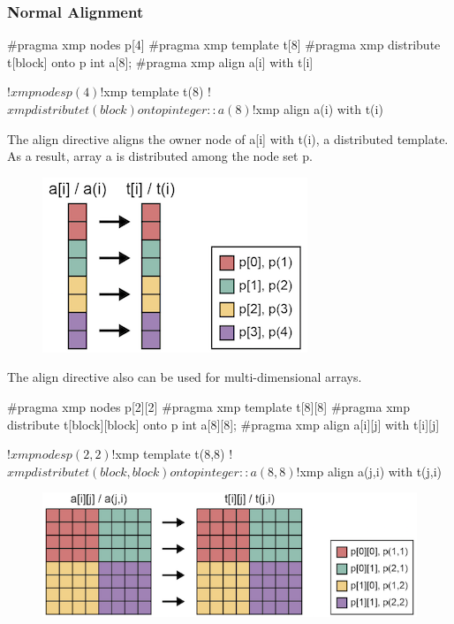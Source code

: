 \subsubsection{Normal Alignment}

\begin{XCexample}
#pragma xmp nodes p[4]
#pragma xmp template t[8]
#pragma xmp distribute t[block] onto p
int a[8];
#pragma xmp align a[i] with t[i]
\end{XCexample}

\begin{XFexample}
!$xmp nodes p(4)
!$xmp template t(8)
!$xmp distribute t(block) onto p
integer :: a(8)
!$xmp align a(i) with t(i)
\end{XFexample}

The align directive aligns the owner node of a[i] with t(i), a
distributed template. As a result, array a is distributed among the node
set p.

\begin{figure}
  \centering
  \includegraphics{figs/1dim.png}
\end{figure}

The align directive also can be used for multi-dimensional arrays.

\begin{XCexample}
#pragma xmp nodes p[2][2]
#pragma xmp template t[8][8]
#pragma xmp distribute t[block][block] onto p
int a[8][8];
#pragma xmp align a[i][j] with t[i][j]
\end{XCexample}

\begin{XFexample}
!$xmp nodes p(2,2)
!$xmp template t(8,8)
!$xmp distribute t(block,block) onto p
integer :: a(8,8)
!$xmp align a(j,i) with t(j,i)
\end{XFexample}

\begin{figure}
  \centering
  \includegraphics{figs/multi-dim.png}
\end{figure}

